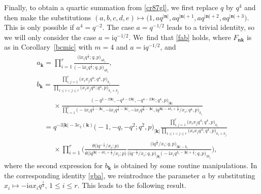 \documentclass[pdftex]{sigma}%
\numberwithin{equation}{section}
\newcommand{\ti}{\mathrm i}
\newcommand\bn{\mathbf n}
\newcommand\bk{\mathbf k}
\begin{document}
Finally, to obtain a
 quartic summation from \eqref{cr87gl}, we first replace $q$ by $q^4$ and
 then make the substitutions
 $(a,b,c,d,e)\mapsto \big(1,a q^{|\bn|},a q^{|\bn|+1},aq^{|\bn|+2},aq^{|\bn|+3}\big)$.
This is only possible if $a^4=q^{-2}$. The case $a=q^{-1/2}$ leads to a
trivial identity, so we will only consider the case $a=\ti q^{-1/2}$. We~find that \eqref{fab} holds, where $F_{\bn\bk}$ is as in Corollary~\ref{bcmic} with $m=4$ and $a=\ti q^{-1/2}$, and
\begin{gather*}
a_{\bk}=\prod\limits_{i=1}^r
\frac{\big(\ti x_i q^{\frac 12};q,p\big)_{4k_i}}{\big({-}\ti x_iq^{\frac 12};q,p\big)_{4k_i}},
\\
b_{\bk}=\frac{\prod\limits_{i,j=1}^r\big(x_ix_jq^4;q^4,p\big)_{k_i}}{\prod\limits_{1\leq i<j\leq r}\big(x_ix_jq^4;q^4,p\big)_{k_i+k_j}}
\\ \phantom{a_{\bk}=}{}
\times\frac{\big({-}q^{2-2|\bk|},-q^{3-2|\bk|},-q^{4-2|\bk|};q^4,p\big)_{|\bk|}}{\prod\limits_{i=1}^r\big({-}\ti x_iq^{\frac 52-|\bk|},-\ti x_iq^{\frac 72-|\bk|},-\ti x_iq^{\frac 92-|\bk|},\ti q^{|\bk|-4k_i+\frac 52}/x_i;q^4,p\big)_{k_i}}
\\ \phantom{a_{\bk}}{}
=q^{-3|\bk|-3e_2(\bk)}\big({-}1,-q,-q^2;q^2,p\big)_{|\bk|}
\frac{\prod\limits_{i,j=1}^r\big(x_ix_jq^4;q^4,p\big)_{k_i}}{\prod\limits_{1\leq i<j\leq r}\big(x_ix_jq^4;q^4,p\big)_{k_i+k_j}}
\\ \phantom{a_{\bk}=}{}
\times
\prod\limits_{i=1}^r\bigg(\frac{\theta\big(\ti q^{-\frac 12}/x_i;p\big)}{\theta\big(\ti q^{|\bk|-4k_i+\frac 12}/x_i;p\big)}\frac{\big(\ti q^{\frac 12}/x_i;q,p\big)_{|\bk|-k_i}}{\big(\ti q^{-\frac 12}/x_i;q,p\big)_{|\bk|}\big({-}\ti x_i q^{k_i-|\bk|+\frac 12};q,p\big)_{3k_i}}\bigg),
\end{gather*}
where the second expression for $b_{\bk}$ is obtained by some routine manipulations. In the corresponding identity \eqref{gba}, we reintroduce the parameter $a$ by substituting $x_i\mapsto -\ti a x_iq^{\frac 12}$, $1\leq i\leq r$. This leads to the following result.
\end{document}
